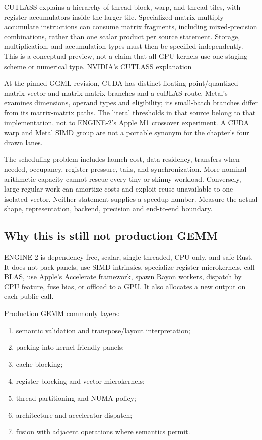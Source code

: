 \documentclass[
  10pt,
]{article}
\providecommand{\tightlist}{%
  \setlength{\itemsep}{0pt}\setlength{\parskip}{0pt}}
\begin{document}
CUTLASS explains a hierarchy of thread-block, warp, and thread tiles,
with register accumulators inside the larger tile. Specialized matrix
multiply-accumulate instructions can consume matrix fragments, including
mixed-precision combinations, rather than one scalar product per source
statement. Storage, multiplication, and accumulation types must then be
specified independently. This is a conceptual preview, not a claim that
all GPU kernels use one staging scheme or numerical type.
\href{https://developer.nvidia.com/blog/cutlass-linear-algebra-cuda/}{NVIDIA's
CUTLASS explanation}

At the pinned GGML revision, CUDA has distinct floating-point/quantized
matrix-vector and matrix-matrix branches and a cuBLAS route. Metal's
\texttt{} examines dimensions,
operand types and eligibility; its small-batch branches differ from its
matrix-matrix paths. The literal thresholds in that source belong to
that implementation, not to ENGINE-2's Apple M1 crossover experiment. A
CUDA warp and Metal SIMD group are not a portable synonym for the
chapter's four drawn lanes.

The scheduling problem includes launch cost, data residency, transfers
when needed, occupancy, register pressure, tails, and synchronization.
More nominal arithmetic capacity cannot rescue every tiny or skinny
workload. Conversely, large regular work can amortize costs and exploit
reuse unavailable to one isolated vector. Neither statement supplies a
speedup number. Measure the actual shape, representation, backend,
precision and end-to-end boundary.

\subsection{Why this is still not production
GEMM}\label{why-this-is-still-not-production-gemm}

ENGINE-2 is dependency-free, scalar, single-threaded, CPU-only, and safe
Rust. It does not pack panels, use SIMD intrinsics, specialize register
microkernels, call BLAS, use Apple's Accelerate framework, spawn Rayon
workers, dispatch by CPU feature, fuse bias, or offload to a GPU. It
also allocates a new output on each public call.

Production GEMM commonly layers:

\begin{enumerate}
\def\labelenumi{\arabic{enumi}.}
\tightlist
\item
  semantic validation and transpose/layout interpretation;
\item
  packing into kernel-friendly panels;
\item
  cache blocking;
\item
  register blocking and vector microkernels;
\item
  thread partitioning and NUMA policy;
\item
  architecture and accelerator dispatch;
\item
  fusion with adjacent operations where semantics permit.
\end{enumerate}
\end{document}
